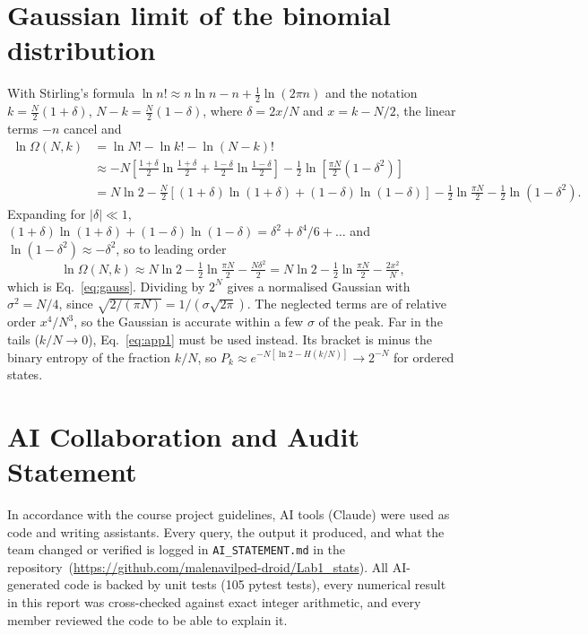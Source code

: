 \documentclass[11pt,a4paper]{article}
\newcommand{\repourl}{https://github.com/malenavilped-droid/Lab1_stats}
\begin{document}
\section{Gaussian limit of the binomial distribution}
\label{app:stirling}
With Stirling's formula $\ln n!\approx n\ln n-n+\frac12\ln(2\pi n)$ and the notation
$k=\frac N2(1+\delta)$, $N-k=\frac N2(1-\delta)$, where $\delta=2x/N$ and $x=k-N/2$, the linear
terms $-n$ cancel and
\begin{align}
  \ln\Omega(N,k)&=\ln N!-\ln k!-\ln(N-k)! \nonumber\\
  &\approx -N\!\left[\tfrac{1+\delta}{2}\ln\tfrac{1+\delta}{2}
     +\tfrac{1-\delta}{2}\ln\tfrac{1-\delta}{2}\right]
     -\tfrac12\ln\!\left[\tfrac{\pi N}{2}(1-\delta^2)\right] \nonumber\\
  &= N\ln2-\tfrac N2\left[(1+\delta)\ln(1+\delta)+(1-\delta)\ln(1-\delta)\right]
     -\tfrac12\ln\tfrac{\pi N}{2}-\tfrac12\ln(1-\delta^2).
  \label{eq:app1}
\end{align}
Expanding for $|\delta|\ll1$, $(1+\delta)\ln(1+\delta)+(1-\delta)\ln(1-\delta)=\delta^2+\delta^4/6+\dots$
and $\ln(1-\delta^2)\approx-\delta^2$, so to leading order
\begin{equation}
  \ln\Omega(N,k)\approx N\ln2-\tfrac12\ln\tfrac{\pi N}{2}-\tfrac{N\delta^2}{2}
  =N\ln2-\tfrac12\ln\tfrac{\pi N}{2}-\tfrac{2x^2}{N},
  \label{eq:app2}
\end{equation}
which is Eq.~\eqref{eq:gauss}. Dividing by $2^N$ gives a normalised Gaussian with
$\sigma^2=N/4$, since $\sqrt{2/(\pi N)}=1/(\sigma\sqrt{2\pi})$. The neglected terms are of
relative order $x^4/N^3$, so the Gaussian is accurate within a few $\sigma$ of the peak. Far in
the tails ($k/N\to0$), Eq.~\eqref{eq:app1} must be used instead. Its bracket is minus the
binary entropy of the fraction $k/N$, so $P_k\approx e^{-N[\ln2-H(k/N)]}\to2^{-N}$ for
ordered states.

\section{AI Collaboration and Audit Statement}
\label{app:ai}
In accordance with the course project guidelines, AI tools (Claude) were used as code and
writing assistants. Every query, the output it produced, and what the team changed or verified
is logged in \texttt{AI\_STATEMENT.md} in the repository~(\url{\repourl}). All AI-generated code
is backed by unit tests (105 pytest tests), every numerical result in this report was
cross-checked against exact integer arithmetic, and every member reviewed the code to be able
to explain it.
\end{document}

